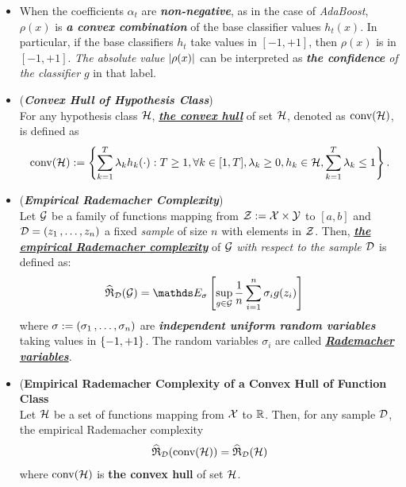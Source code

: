 \documentclass[11pt]{article}
\begin{document}
\begin{itemize}
\item \begin{remark}
When the coefficients $\alpha_t$ are \emph{\textbf{non-negative}}, as in the case of \emph{AdaBoost}, $\rho(x)$ is \emph{\textbf{a convex combination}} of the base classifier values $h_t(x)$. In particular, if the base classifiers $h_t$ take values in $[-1, +1]$, then $\rho(x)$ is in $[-1, +1]$. \emph{The absolute value} $\left\lvert \rho(x) \right\rvert$ can be interpreted as \emph{\textbf{the confidence} of the classifier} $g$ in that label.
\end{remark}

\item \begin{definition}(\emph{\textbf{Convex Hull of Hypothesis Class}})\\
For any hypothesis class ${\mathcal H}$, \underline{\textbf{\emph{the convex hull}}} of set ${\mathcal H}$, denoted as $\text{conv}({\mathcal H})$, is defined as 
\begin{align*}
\text{conv}({\mathcal H}) := \left\{\sum_{k=1}^{T}\lambda_k h_k(\cdot):  T \ge 1, \forall k \in [1, T], \lambda_k \ge 0, h_k \in {\mathcal H}, \sum_{k=1}^{T}\lambda_k \le 1\right\}.
\end{align*}
\end{definition}

\item \begin{definition} (\emph{\textbf{Empirical Rademacher Complexity}})\\
Let ${\mathcal G}$ be a family of functions mapping from ${\mathcal Z} := {\mathcal X} \times {\mathcal Y}$ to $[a, b]$ and ${\mathcal D} = (z_1 \,{,}\ldots{,}\, z_n)$ a fixed \emph{sample} of size $n$ with elements in ${\mathcal Z}$. Then, \underline{\emph{\textbf{the empirical Rademacher complexity}}} of ${\mathcal G}$ \emph{with respect to the sample ${\mathcal D}$} is defined as:
\begin{align}
\widehat{\mathfrak{R}}_{\cD}(\cG)&= \E{\sigma}{\sup_{g \in \cG}\frac{1}{n}\sum_{i=1}^{n}\sigma_{i}g(z_i)}   \label{eqn: rademacher_complexity}
\end{align}
where $\sigma := (\sigma_1 \,{,}\ldots{,}\, \sigma_n)$ are  \textbf{\emph{independent uniform random variables}} taking values in $\left\{-1, +1\right\}$. The random variables $\sigma_i$ are called \underline{\emph{\textbf{Rademacher variables}}}.
\end{definition}

\item \begin{proposition}(\textbf{Empirical Rademacher Complexity of a Convex Hull of Function Class}\\
Let ${\mathcal H}$ be a set of functions mapping from ${\mathcal X}$ to ${\mathbb R}$. Then, for any sample ${\mathcal D}$, the empirical Rademacher complexity 
\begin{align}
\widehat{{\mathfrak R}}_{{\mathcal D}}(\text{conv}({\mathcal H}))  = \widehat{{\mathfrak R}}_{{\mathcal D}}({\mathcal H}) \label{eqn: rademacher_complexity_convex_hull}
\end{align} where $\text{conv}({\mathcal H})$ is \textbf{the convex hull} of set ${\mathcal H}$.
\end{proposition}
\end{itemize}
\end{document}
